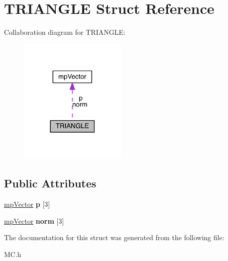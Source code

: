 \hypertarget{struct_t_r_i_a_n_g_l_e}{}\section{T\+R\+I\+A\+N\+G\+LE Struct Reference}
\label{struct_t_r_i_a_n_g_l_e}


Collaboration diagram for T\+R\+I\+A\+N\+G\+LE\+:
\nopagebreak
\begin{figure}[H]
\begin{center}
\leavevmode
\includegraphics[width=146pt]{struct_t_r_i_a_n_g_l_e__coll__graph}
\end{center}
\end{figure}
\subsection*{Public Attributes}
\begin{DoxyCompactItemize}
\item 
\mbox{\label{struct_t_r_i_a_n_g_l_e_accc6f02c535465b09e6fa59d1e80a4a2}} 
\mbox{\hyperlink{classmp_vector}{mp\+Vector}} {\bfseries p} \mbox{[}3\mbox{]}
\item 
\mbox{\label{struct_t_r_i_a_n_g_l_e_a5fbcb89b724bbe7fdd03deac5edfd8de}} 
\mbox{\hyperlink{classmp_vector}{mp\+Vector}} {\bfseries norm} \mbox{[}3\mbox{]}
\end{DoxyCompactItemize}


The documentation for this struct was generated from the following file\+:\begin{DoxyCompactItemize}
\item 
M\+C.\+h\end{DoxyCompactItemize}

